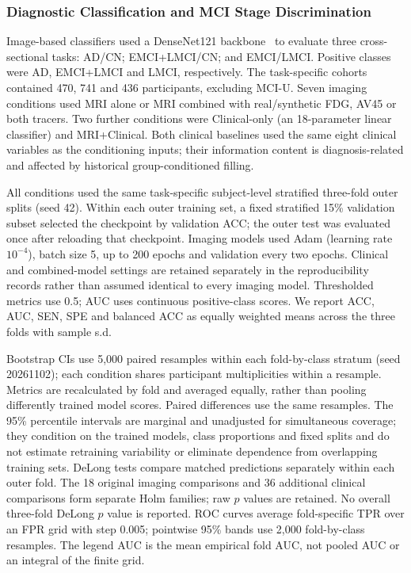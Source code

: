 \subsubsection{Diagnostic Classification and MCI Stage Discrimination}
Image-based classifiers used a DenseNet121 backbone~\cite{huang2017densely} to evaluate three cross-sectional tasks: AD/CN; EMCI+LMCI/CN; and EMCI/LMCI. Positive classes were AD, EMCI+LMCI and LMCI, respectively. The task-specific cohorts contained 470, 741 and 436 participants, excluding MCI-U. Seven imaging conditions used MRI alone or MRI combined with real/synthetic FDG, AV45 or both tracers. Two further conditions were Clinical-only (an 18-parameter linear classifier) and MRI+Clinical. Both clinical baselines used the same eight clinical variables as the conditioning inputs; their information content is diagnosis-related and affected by historical group-conditioned filling.

All conditions used the same task-specific subject-level stratified three-fold outer splits (seed 42). Within each outer training set, a fixed stratified 15\% validation subset selected the checkpoint by validation ACC; the outer test was evaluated once after reloading that checkpoint. Imaging models used Adam (learning rate $10^{-4}$), batch size 5, up to 200 epochs and validation every two epochs. Clinical and combined-model settings are retained separately in the reproducibility records rather than assumed identical to every imaging model. Thresholded metrics use 0.5; AUC uses continuous positive-class scores. We report ACC, AUC, SEN, SPE and balanced ACC as equally weighted means across the three folds with sample s.d.

Bootstrap CIs use 5,000 paired resamples within each fold-by-class stratum (seed 20261102); each condition shares participant multiplicities within a resample. Metrics are recalculated by fold and averaged equally, rather than pooling differently trained model scores. Paired differences use the same resamples. The 95\% percentile intervals are marginal and unadjusted for simultaneous coverage; they condition on the trained models, class proportions and fixed splits and do not estimate retraining variability or eliminate dependence from overlapping training sets. DeLong tests compare matched predictions separately within each outer fold. The 18 original imaging comparisons and 36 additional clinical comparisons form separate Holm families; raw $p$ values are retained. No overall three-fold DeLong $p$ value is reported. ROC curves average fold-specific TPR over an FPR grid with step 0.005; pointwise 95\% bands use 2,000 fold-by-class resamples. The legend AUC is the mean empirical fold AUC, not pooled AUC or an integral of the finite grid.

